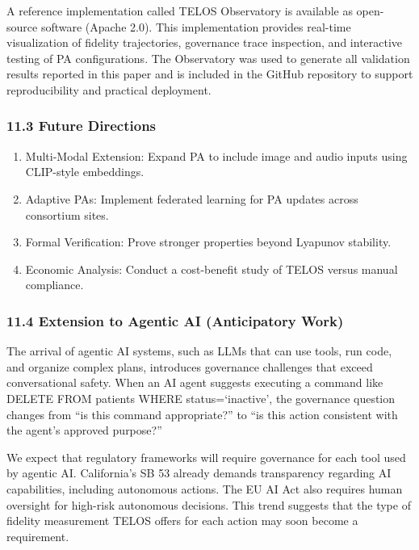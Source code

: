 A reference implementation called TELOS Observatory is available as
open-source software (Apache 2.0). This implementation provides
real-time visualization of fidelity trajectories, governance trace
inspection, and interactive testing of PA configurations. The
Observatory was used to generate all validation results reported in this
paper and is included in the GitHub repository to support
reproducibility and practical deployment.

\subsubsection{11.3 Future Directions}\label{future-directions}

\begin{enumerate}
\def\labelenumi{\arabic{enumi}.}
\tightlist
\item
  Multi-Modal Extension: Expand PA to include image and audio inputs
  using CLIP-style embeddings.
\item
  Adaptive PAs: Implement federated learning for PA updates across
  consortium sites.
\item
  Formal Verification: Prove stronger properties beyond Lyapunov
  stability.
\item
  Economic Analysis: Conduct a cost-benefit study of TELOS versus manual
  compliance.
\end{enumerate}

\subsubsection{11.4 Extension to Agentic AI (Anticipatory
Work)}\label{extension-to-agentic-ai-anticipatory-work}

The arrival of agentic AI systems, such as LLMs that can use tools, run
code, and organize complex plans, introduces governance challenges that
exceed conversational safety. When an AI agent suggests executing a
command like DELETE FROM patients WHERE status=`inactive', the
governance question changes from ``is this command appropriate?'' to
``is this action consistent with the agent's approved purpose?''

We expect that regulatory frameworks will require governance for each
tool used by agentic AI. California's SB 53 already demands transparency
regarding AI capabilities, including autonomous actions. The EU AI Act
also requires human oversight for high-risk autonomous decisions. This
trend suggests that the type of fidelity measurement TELOS offers for
each action may soon become a requirement.

